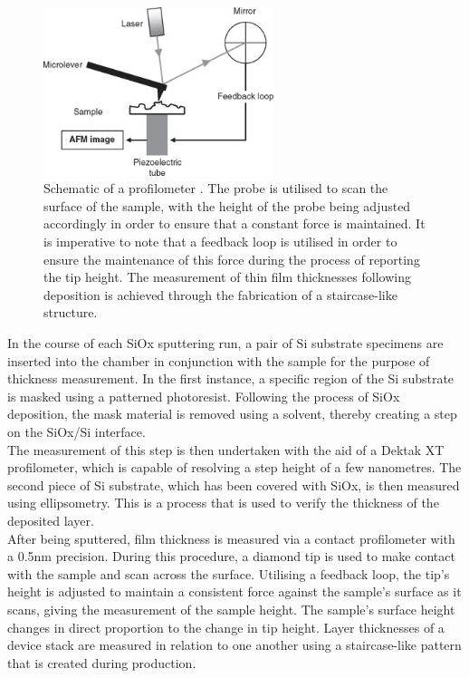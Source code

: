 \begin{figure}[htbp!] 
    \centering    
    \includegraphics[width=0.6\textwidth]{Chapter3/Figs/c.png}
    \caption[Contact profilometer for thin film thickness measurements.]{Schematic of a profilometer \cite{mabilleau2008vitro}. The probe is utilised to scan the surface of the sample, with the height of the probe being adjusted accordingly in order to ensure that a constant force is maintained. It is imperative to note that a feedback loop is utilised in order to ensure the maintenance of this force during the process of reporting the tip height. The measurement of thin film thicknesses following deposition is achieved through the fabrication of a staircase-like structure.}
    \label{fig:3c}
\end{figure}

\noindent In the course of each SiOx sputtering run, a pair of Si substrate specimens are inserted into the chamber in conjunction with the sample for the purpose of thickness measurement. In the first instance, a specific region of the Si substrate is masked using a patterned photoresist. Following the process of SiOx deposition, the mask material is removed using a solvent, thereby creating a step on the SiOx/Si interface. \\

\noindent The measurement of this step is then undertaken with the aid of a Dektak XT profilometer, which is capable of resolving a step height of a few nanometres. The second piece of Si substrate, which has been covered with SiOx, is then measured using ellipsometry. This is a process that is used to verify the thickness of the deposited layer.\\

\noindent After being sputtered, film thickness is measured via a contact profilometer with a 0.5nm precision. During this procedure, a diamond tip is used to make contact with the sample and scan across the surface. Utilising a feedback loop, the tip's height is adjusted to maintain a consistent force against the sample's surface as it scans, giving the measurement of the sample height. The sample's surface height changes in direct proportion to the change in tip height. Layer thicknesses of a device stack are measured in relation to one another using a staircase-like pattern that is created during production. 

